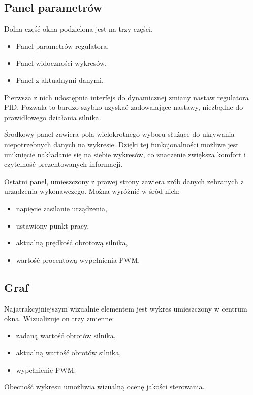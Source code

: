     
    \subsection{Panel parametrów}
        Dolna część okna podzielona jest na trzy części.
        
        \begin{itemize}
            \item Panel parametrów regulatora.
            \item Panel widoczności wykresów.
            \item Panel z aktualnymi danymi.
        \end{itemize}
        
        Pierwsza z nich udostępnia interfejs do dynamicznej zmiany nastaw regulatora PID. Pozwala to bardzo szybko uzyskać zadowalające nastawy, niezbędne do prawidłowego działania silnika. 
        
        Środkowy panel zawiera pola wielokrotnego wyboru służące do ukrywania niepotrzebnych danych na wykresie. Dzięki tej funkcjonalności możliwe jest uniknięcie nakładanie się na siebie wykresów, co znaczenie zwiększa komfort i czytelność prezentowanych informacji.
        
        Ostatni panel, umieszczony z prawej strony zawiera zrób danych zebranych z urządzenia wykonawczego. Można wyróżnić w śród nich:
        
        \begin{itemize}
            \item napięcie zasilanie urządzenia,
            \item ustawiony punkt pracy,
            \item aktualną prędkość obrotową silnika,
            \item wartość procentową wypełnienia PWM.
        \end{itemize}

    \subsection{Graf}
        Najatrakcyjniejszym wizualnie elementem jest wykres umieszczony w centrum okna. Wizualizuje on trzy zmienne:
        
        \begin{itemize}
            \item zadaną wartość obrotów silnika,
            \item aktualną wartość obrotów silnika,
            \item wypełnienie PWM.
        \end{itemize}
        
        Obecność wykresu umożliwia wizualną ocenę jakości sterowania.